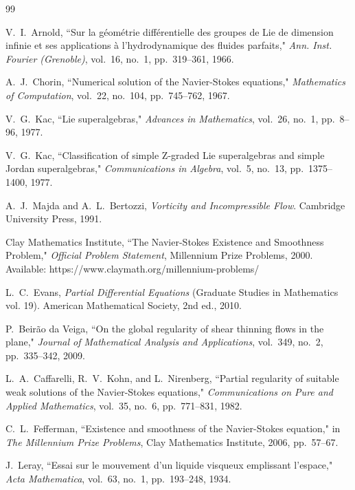 \documentclass[reqno,10pt]{amsart}
\theoremstyle{plain}
\theoremstyle{definition}
\begin{document}
\begin{thebibliography}{99}

V.~I.~Arnold,
``Sur la géométrie différentielle des groupes de Lie de dimension infinie et ses applications à l'hydrodynamique des fluides parfaits,"
\textit{Ann. Inst. Fourier (Grenoble)}, vol.~16, no.~1, pp.~319--361, 1966.

A.~J.~Chorin,
``Numerical solution of the Navier-Stokes equations,"
\textit{Mathematics of Computation}, vol.~22, no.~104, pp.~745--762, 1967.

V.~G.~Kac,
``Lie superalgebras,"
\textit{Advances in Mathematics}, vol.~26, no.~1, pp.~8--96, 1977.

V.~G.~Kac,
``Classification of simple Z-graded Lie superalgebras and simple Jordan superalgebras,"
\textit{Communications in Algebra}, vol.~5, no.~13, pp.~1375--1400, 1977.

A.~J.~Majda and A.~L.~Bertozzi,
\textit{Vorticity and Incompressible Flow}.
 Cambridge University Press, 1991.

Clay Mathematics Institute,
``The Navier-Stokes Existence and Smoothness Problem,"
\textit{Official Problem Statement}, Millennium Prize Problems, 2000.
\\Available: https://www.claymath.org/millennium-problems/

L.~C.~Evans,
\textit{Partial Differential Equations} (Graduate Studies in Mathematics vol. 19).
American Mathematical Society, 2nd ed., 2010.

P.~Beirão da Veiga,
``On the global regularity of shear thinning flows in the plane,"
\textit{Journal of Mathematical Analysis and Applications}, vol.~349, no.~2, pp.~335--342, 2009.

L.~A.~Caffarelli, R.~V.~Kohn, and L.~Nirenberg,
``Partial regularity of suitable weak solutions of the Navier-Stokes equations,"
\textit{Communications on Pure and Applied Mathematics}, vol.~35, no.~6, pp.~771--831, 1982.

C.~L.~Fefferman,
``Existence and smoothness of the Navier-Stokes equation,"
in \textit{The Millennium Prize Problems},
Clay Mathematics Institute, 2006, pp.~57--67.

J.~Leray,
``Essai sur le mouvement d'un liquide visqueux emplissant l'espace,"
\textit{Acta Mathematica}, vol.~63, no.~1, pp.~193--248, 1934.


\end{thebibliography}
\end{document}
